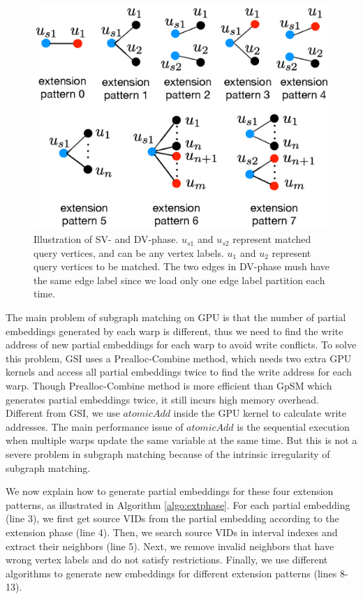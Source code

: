\begin{figure}
\centering
\includegraphics[width=0.9\columnwidth]{./figure/extpattern.eps}
\caption{Illustration of SV- and DV-phase. $u_{s1}$ and $u_{s2}$ represent matched query vertices, and can be any vertex labels. $u_1$ and $u_2$ represent query vertices to be matched. The two edges in DV-phase mush have the same edge label since we load only one edge label partition each time.}	
\label{fig:extpattern}
\end{figure}

The main problem of subgraph matching on GPU is that the number of partial embeddings generated by each warp is different, thus we need to find the write address of new partial embeddings for each warp to avoid write conflicts. To solve this problem, GSI \cite{zeng2020gsi} uses a Prealloc-Combine method, which needs two extra GPU kernels and access all partial embeddings twice to find the write address for each warp. Though Prealloc-Combine method is more efficient than GpSM \cite{tran2015fast} which generates partial embeddings twice, it still incurs high memory overhead. Different from GSI, we use $atomicAdd$ inside the GPU kernel to calculate write addresses. The main performance issue of $atomicAdd$ is the sequential execution when multiple warps update the same variable at the same time. But this is not a severe problem in subgraph matching because of the intrinsic irregularity of subgraph matching.

We now explain how to generate partial embeddings for these four extension patterns, as illustrated in Algorithm \ref{algo:extphase}. For each partial embedding (line 3), we first get source VIDs from the partial embedding according to the extension phase (line 4). Then, we search source VIDs in interval indexes and extract their neighbors (line 5).  Next, we remove invalid neighbors that have wrong vertex labels and do not satisfy restrictions. Finally, we use different algorithms to generate new embeddings for different extension patterns (lines 8-13).


